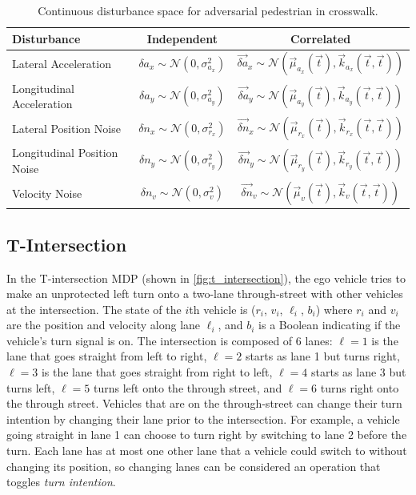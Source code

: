 \begin{table}
    \centering
    \caption{Continuous disturbance space for adversarial pedestrian in crosswalk.}
    \label{tab:adversarial_ped_disturbance_space}
    \begin{tabular}{@{}lcc@{}} 
        \toprule
        \textbf{Disturbance} & \textbf{Independent} & \textbf{Correlated} \\
        \midrule
        Lateral Acceleration &  $\delta a_x \sim \mathcal{N}(0, \sigma_{a_x}^2)$ &  $\vec{\delta a}_x \sim \mathcal{N}(\vec{\mu}_{a_x}(\vec{t}), \vec{k}_{a_x}(\vec{t}, \vec{t}))$ \\
        Longitudinal Acceleration &  $ \delta a_y \sim \mathcal{N}(0, \sigma_{a_y}^2)$ &  $\vec{\delta a}_y \sim \mathcal{N}(\vec{\mu}_{a_y}(\vec{t}), \vec{k}_{a_y}(\vec{t}, \vec{t}))$ \\
        Lateral Position Noise &  $\delta n_x \sim \mathcal{N}(0, \sigma_{r_x}^2)$ &  $\vec{\delta n}_x \sim \mathcal{N}(\vec{\mu}_{r_x}(\vec{t}), \vec{k}_{r_x}(\vec{t}, \vec{t}))$ \\
        Longitudinal Position Noise &  $\delta n_y \sim \mathcal{N}(0, \sigma_{r_y}^2)$ &  $\vec{\delta n}_y \sim \mathcal{N}(\vec{\mu}_{r_y}(\vec{t}), \vec{k}_{r_y}(\vec{t}, \vec{t}))$ \\
        Velocity Noise &  $\delta n_v \sim \mathcal{N}(0, \sigma_{v}^2)$ &  $\vec{\delta n}_{v} \sim \mathcal{N}(\vec{\mu}_{v}(\vec{t}), \vec{k}_{v}(\vec{t}, \vec{t}))$ \\
        \bottomrule
    \end{tabular}
\end{table}
 



\subsection{T-Intersection}

In the T-intersection MDP (shown in \cref{fig:t_intersection}), the ego vehicle tries to make an unprotected left turn onto a two-lane through-street with other vehicles at the intersection. The state of the $i$th vehicle is ($r_i$, $v_i$, $\ell_i$, $b_i$) where $r_i$ and $v_i$ are the position and velocity along lane $\ell_i$, and $b_i$ is a Boolean indicating if the vehicle's turn signal is on. The intersection is composed of \num{6} lanes: $\ell = 1$ is the lane that goes straight from left to right, $\ell = 2$ starts as lane \num{1} but turns right, $\ell = 3$ is the lane that goes straight from right to left, $\ell = 4$ starts as lane \num{3} but turns left, $\ell = 5$ turns left onto the through street, and $\ell = 6$ turns right onto the through street. Vehicles that are on the through-street can change their turn intention by changing their lane prior to the intersection. For example, a vehicle going straight in lane \num{1} can choose to turn right by switching to lane \num{2} before the turn. Each lane has at most one other lane that a vehicle could switch to without changing its position, so changing lanes can be considered an operation that toggles \emph{turn intention}.

